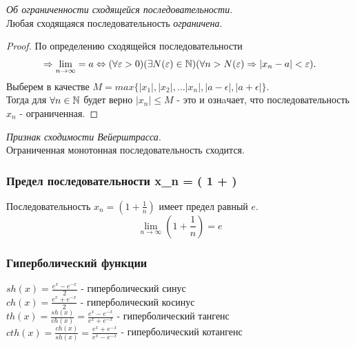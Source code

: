 \begin{theorem}
  \textit{Об ограниченности сходящейся последовательности}. \\ 
  Любая сходящаяся последовательность \textit{ограничена}. 
\end{theorem}

\begin{proof}
  По определению сходящейся последовательности 
  \begin{gather*}
    \implies \lim_{n \to \infty} = a \iff (\forall \epsilon > 0)(\exists N(\epsilon)\in \N)(\forall n > N(\epsilon) \implies |x_{n} - a| < \epsilon).
  \end{gather*}
  Выберем в качестве $M = max \{|x_{1}|, |x_2|, \ldots |x_n|, |a - \epsilon|, |a + \epsilon|\}$. \\
Тогда для $\forall n \in \mathbb{N}$ будет верно $|x_{n}| \le M$ - это и ознaчает, что последовательность $x_{n}$ - ограниченная.
\end{proof}

\begin{theorem}
  \textit{Признак сходимости Вейерштрасса}. \\
  Ограниченная монотонная последовательность сходится.
\end{theorem}

\subsubsection{Предел последовательности x_{n} = \left( 1 +  \right)}

\begin{theorem}
  Последовательность $x_{n} = \left( 1 + \frac{1}{n} \right) $ имеет предел равный $e$.
  \[
  \lim_{n \to \infty} \left( 1 + \frac{1}{n} \right) = e 
  \] 
\end{theorem}

\subsubsection{Гиперболический функции}

\begin{itemize}
$sh\left( x \right) = \frac{e^x - e^{-x}}{2}$ - гиперболический синус \\
$ch\left( x \right) = \frac{e^x + e^{-x}}{2}$ - гиперболический косинус \\
$th\left( x \right) = \frac{sh(x)}{ch(x)} = \frac{e^x - e^{-x}}{e^x + e^{-x}}$ - гиперболический тангенс \\
$cth\left( x \right) = \frac{ch(x)}{sh(x)} = \frac{e^x + e^{-x}}{e^x - e^{-x}}$ - гиперболический котангенс \\
\end{itemize}

